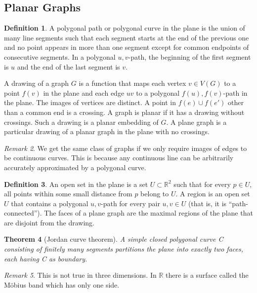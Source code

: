 \documentclass[10pt, fleqn, a4paper, landscape]{article}
\theoremstyle{plain} %
\newtheorem{thm}{Theorem}
\theoremstyle{remark} %
\newtheorem{rem}[thm]{Remark}
\theoremstyle{definition} %
\newtheorem{defi}[thm]{Definition}
\begin{document}
\begin{multicols}{3}
\begin{tiny}
\section{Planar Graphs}
\begin{defi}
A polygonal path or polygonal curve in the plane is the union of many line segments such that each segment starts at the end of the previous one and no point appears in more than one segment except for common endpoints of consecutive segments. In a polygonal $u, v$-path, the beginning of the first segment is $u$ and the end of the last segment is $v$.

A drawing of a graph $G$ is a function that maps each vertex $v\in V (G)$ to a point $f(v)$ in the plane and each edge $uv$ to a polygonal $f(u), f(v)$-path in the plane. The images of vertices are distinct.
A point in $f(e)\cup f(e')$ other than a common end is a crossing. A graph is planar if it has a drawing without crossings. Such a drawing is a planar embedding of $G$. A plane graph is a particular drawing of a planar graph in the plane with no crossings.
\end{defi}
\addtocounter{thm}{1}
\begin{rem}
We get the same class of graphs if we only require images of edges to be continuous curves. This is because any continuous line can be arbitrarily accurately approximated by a polygonal curve.
\end{rem}

\begin{defi}
An open set in the plane is a set $U \subset \mathbb{R}^2$ such that for every $p\in U$, all points within some small distance from $p$ belong to $U$. A region is an open set $U$ that contains a polygonal $u, v$-path for every pair $u, v \in U$ (that is, it is “path-connected”). The faces of a plane graph are the maximal regions of the plane that are disjoint from the drawing.
\end{defi}

\begin{thm}[Jordan curve theorem]
A simple closed polygonal curve C consisting of finitely
many segments partitions the plane into exactly two faces, each having C as boundary.
\end{thm}

\begin{rem}
This is not true in three dimensions. In $\mathbb{R}$ there is a surface called the Möbius band which has only one side.
\end{rem}


\end{tiny}
\end{multicols}
\end{document}
